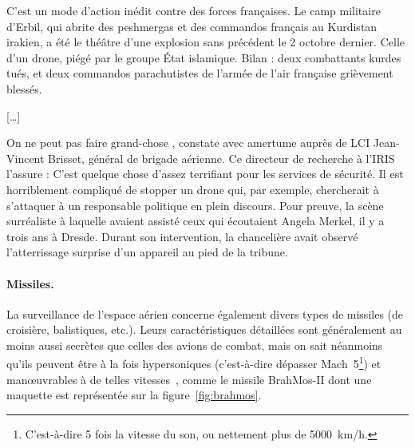 	\begin{displayquote}
	C'est un mode d'action inédit contre des forces françaises. Le camp militaire d'Erbil, qui abrite des peshmergas et des commandos français au Kurdistan irakien, a été le théâtre d'une explosion sans précédent le 2 octobre dernier. Celle d'un drone, piégé par le groupe État islamique. Bilan : deux combattants kurdes tués, et deux commandos parachutistes de l'armée de l'air française grièvement blessés.
	
	[\ldots{}]
	
	\og On ne peut pas faire grand-chose \fg{}, constate avec amertume auprès de LCI Jean-Vincent Brisset, général de brigade aérienne. Ce directeur de recherche à l'IRIS l'assure : \og C'est quelque chose d'assez terrifiant pour les services de sécurité. Il est horriblement compliqué de stopper un drone qui, par exemple, chercherait à s'attaquer à un responsable politique en plein discours. \fg{} Pour preuve, la scène surréaliste à laquelle avaient assisté ceux qui écoutaient Angela Merkel, il y a trois ans à Dresde. Durant son intervention, la chancelière avait observé l'atterrissage surprise d'un appareil au pied de la tribune\footnotemark.	
	\end{displayquote}
	
	
	\paragraph{Missiles.}
	La surveillance de l'espace aérien concerne également divers types de missiles (de croisière, balistiques, etc.). Leurs caractéristiques détaillées sont généralement au moins aussi secrètes que celles des avions de combat, mais on sait néanmoins qu'ils peuvent être à la fois hypersoniques (c'est-à-dire dépasser Mach~5\footnote{C'est-à-dire 5 fois la vitesse du son, ou nettement plus de 5000~km/h.}) et manœuvrables à de telles vitesses~\cite{missiles}, comme le missile BrahMos-II dont une maquette est représentée sur la figure~\ref{fig:brahmos}.
	
